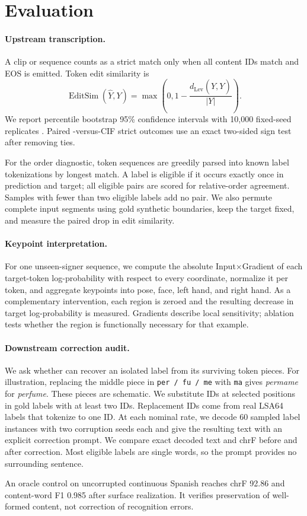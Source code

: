 \section{Evaluation}

\paragraph{Upstream transcription.}
A clip or sequence counts as a strict match only when all content IDs match
and EOS is emitted.  Token edit similarity is
\begin{equation}
  \operatorname{EditSim}(\hat{Y},Y)=
  \max\left(0,1-\frac{d_{\mathrm{Lev}}(\hat{Y},Y)}{|Y|}\right).
\end{equation}
We report percentile bootstrap 95\% confidence intervals with 10,000 fixed-seed
replicates \citep{efron1979bootstrap}.  Paired \ImitatorEOne{}-versus-CIF strict
outcomes use an
exact two-sided sign test after removing ties.

For the order diagnostic, token sequences are greedily parsed into known label
tokenizations by longest match.  A label is eligible if it occurs exactly once in
prediction and target; all eligible pairs are scored for relative-order agreement.
Samples with fewer than two eligible labels add no pair.  We also permute complete
input segments using gold synthetic boundaries, keep the target fixed, and measure
the paired drop in edit similarity.

\paragraph{Keypoint interpretation.}
For one unseen-signer sequence, we compute the absolute Input$\times$Gradient of
each target-token log-probability with respect to every coordinate, normalize it
per token, and aggregate keypoints into pose, face, left hand, and right hand.
As a complementary intervention, each region is zeroed and the resulting decrease
in target log-probability is measured.  Gradients describe local sensitivity;
ablation tests whether the region is functionally necessary for that example.

\paragraph{Downstream correction audit.}
We ask whether \Gemma{} can recover an isolated label from its surviving token
pieces. For illustration, replacing the middle piece in
\texttt{per\,/\,fu\,/\,me} with \texttt{ma} gives \emph{permame} for
\emph{perfume}. These pieces are schematic.
We substitute IDs at selected positions in gold labels with at least two IDs.
Replacement IDs come from real LSA64 labels that tokenize to one ID. At each
nominal rate, we decode 60 sampled label instances with two corruption seeds each
and give \Gemma{} the resulting text with an explicit correction prompt.
We compare exact decoded text and chrF before and after correction. Most eligible
labels are single words, so the prompt provides no surrounding sentence.

An oracle control on uncorrupted continuous Spanish reaches chrF 92.86 and
content-word F1 0.985 after surface realization.  It verifies preservation of
well-formed content, not correction of recognition errors.
